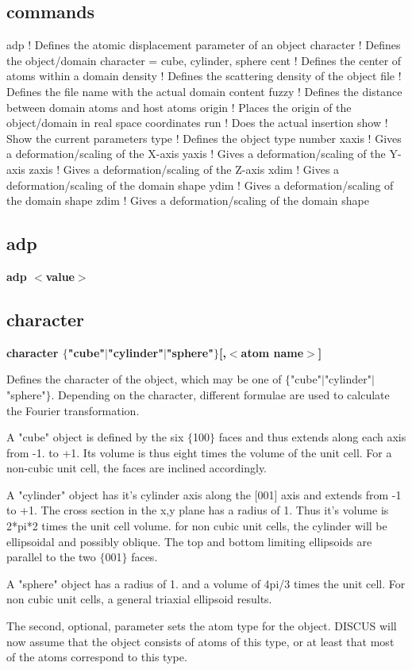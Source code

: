 \subsection*{commands}
\begin{MacVerbatim}
adp        ! Defines the atomic displacement parameter of an object
character  ! Defines the object/domain character = cube, cylinder, sphere
cent       ! Defines the center of atoms within a domain
density    ! Defines the scattering density of the object
file       ! Defines the file name with the actual domain content
fuzzy      ! Defines the distance between domain atoms and host atoms
origin     ! Places the origin of the object/domain in real space coordinates
run        ! Does the actual insertion
show       ! Show the current parameters
type       ! Defines the object type number
xaxis      ! Gives a deformation/scaling of the X-axis
yaxis      ! Gives a deformation/scaling of the Y-axis
zaxis      ! Gives a deformation/scaling of the Z-axis
xdim       ! Gives a deformation/scaling of the domain shape
ydim       ! Gives a deformation/scaling of the domain shape
zdim       ! Gives a deformation/scaling of the domain shape
\end{MacVerbatim}
\subsection*{adp}
{\bf adp $ <$value$> $ \par }
\subsection*{character}
{\bf character $ \{$"cube"$| $"cylinder"$| $"sphere"$\} $[,$ <$atom name$> $] \par }
\par
\vspace{3pt}
Defines the character of the object, which may be one of 
$ \{$"cube"$| $"cylinder"$| $"sphere"$\} $. Depending on the character, 
different formulae are used to calculate the Fourier transformation. 
\par
A "cube" object is defined by the six $ \{$100$\} $ faces and thus extends 
along each axis from -1. to +1. Its volume is thus eight times 
the volume of the unit cell. For a non-cubic unit cell, the 
faces are inclined accordingly. 
\par
A "cylinder" object has it's cylinder axis along the [001] axis and 
extends from -1 to +1. The cross section in the x,y plane has a 
radius of 1. Thus it's volume is 2*pi*2 times the unit cell volume. 
for non cubic unit cells, the cylinder will be ellipsoidal and 
possibly oblique. The top and bottom limiting ellipsoids are 
parallel to the two $ \{$001$\} $ faces. 
\par
A "sphere" object has a radius of 1. and a volume of 4pi/3 times 
the unit cell. For non cubic unit cells, a general triaxial 
ellipsoid results. 
\par
The second, optional, parameter sets the atom type for the object. 
DISCUS will now assume that the object consists of atoms of this 
type, or at least that most of the atoms correspond to this type. 
